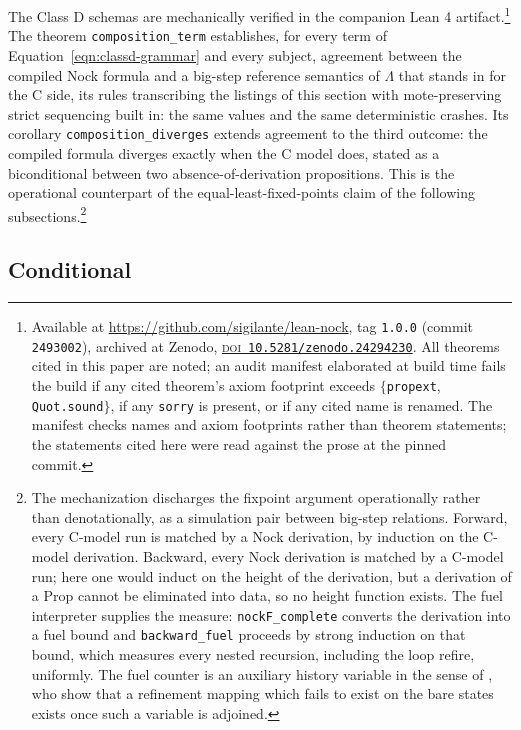 \documentclass[twoside]{article}
\begin{document}
The Class D schemas are mechanically verified in the companion Lean 4 artifact.\footnote{Available at \url{https://github.com/sigilante/lean-nock}, tag \texttt{1.0.0} (commit \texttt{2493002}), archived at Zenodo, \href{https://doi.org/10.5281/zenodo.24294230}{\textsc{doi}~\texttt{10.5281/zenodo.24294230}}.  All theorems cited in this paper are noted; an audit manifest elaborated at build time fails the build if any cited theorem's axiom footprint exceeds $\{$\texttt{propext}, \texttt{Quot.sound}$\}$, if any \texttt{sorry} is present, or if any cited name is renamed.  The manifest checks names and axiom footprints rather than theorem statements; the statements cited here were read against the prose at the pinned commit.}  The theorem \lstinline[style=inlinecode]{composition_term} establishes, for every term of Equation~\ref{eqn:classd-grammar} and every subject, agreement between the compiled Nock formula and a big-step reference semantics of $\Lambda$ that stands in for the C side, its rules transcribing the listings of this section with mote-preserving strict sequencing built in: the same values and the same deterministic crashes.  Its corollary \lstinline[style=inlinecode]{composition_diverges} extends agreement to the third outcome:  the compiled formula diverges exactly when the C model does, stated as a biconditional between two absence-of-derivation propositions.  This is the operational counterpart of the equal-least-fixed-points claim of the following subsections.\footnote{The mechanization discharges the fixpoint argument operationally rather than denotationally, as a simulation pair between big-step relations.  Forward, every C-model run is matched by a Nock derivation, by induction on the C-model derivation.  Backward, every Nock derivation is matched by a C-model run; here one would induct on the height of the derivation, but a derivation of a \textsf{Prop} cannot be eliminated into data, so no height function exists.  The fuel interpreter supplies the measure:  \lstinline[style=inlinecode]{nockF_complete} converts the derivation into a fuel bound and \lstinline[style=inlinecode]{backward_fuel} proceeds by strong induction on that bound, which measures every nested recursion, including the loop refire, uniformly.  The fuel counter is an auxiliary history variable in the sense of \citet{AbadiLamport1991}, who show that a refinement mapping which fails to exist on the bare states exists once such a variable is adjoined.}

\subsection{Conditional}
\end{document}

